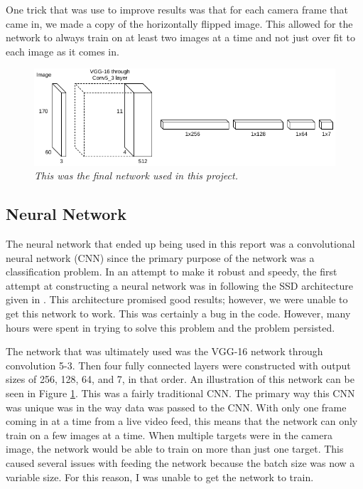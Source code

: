 \documentclass[letterpaper, 10 pt, conference]{ieeeconf}  %
\begin{document}
One trick that was use to improve results was that for each camera frame that came in, we made a copy of the horizontally flipped image. This allowed for the network to always train on at least two images at a time and not just over fit to each image as it comes in. 

\begin{figure}
	\begin{center}
		\includegraphics[width=.95\textwidth]{cnn.png}
		\caption{\textit{This was the final network used in this project.}} 
		\label{fig:cnn}
	\end{center}
\end{figure}

\subsection{Neural Network}

The neural network that ended up being used in this report was a convolutional neural network (CNN) since the primary purpose of the network was a classification problem. In an attempt to make it robust and speedy, the first attempt at constructing a neural network was in following the SSD architecture given in \cite{liu2016ssd}. This architecture promised good results; however, we were unable to get this network to work. This was certainly a bug in the code. However, many hours were spent in trying to solve this problem and the problem persisted. 

The network that was ultimately used was the VGG-16 network through convolution 5-3. Then four fully connected layers were constructed with output sizes of 256, 128, 64, and 7, in that order. An illustration of this network can be seen in Figure \ref{fig:cnn}. This was a fairly traditional CNN. The primary way this CNN was unique was in the way data was passed to the CNN. With only one frame coming in at a time from a live video feed, this means that the network can only train on a few images at a time. When multiple targets were in the camera image, the network would be able to train on more than just one target. This caused several issues with feeding the network because the batch size was now a variable size. For this reason, I was unable to get the network to train.
\end{document}
